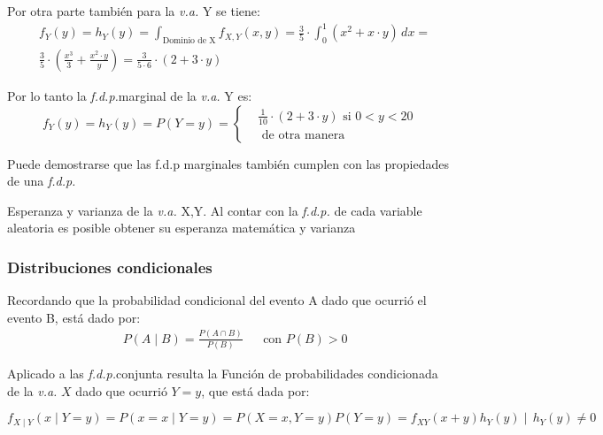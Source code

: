 Por otra parte también para la \textit{v.a.} Y se tiene:
\begin{align*}
    &f_Y\left(y\right)=h_Y\left(y\right) = \int_{\text{Dominio de X}}f_{X,Y} \left(x,y\right) =\frac{3}{5}\cdot \int_0^1\left( x^2+ x\cdot y \right) \,dx=\\
    &\frac{3}{5}\cdot \left(\frac{x^3}{3}+\frac{x^2\cdot  y}{y}\right)=\frac{3}{5\cdot 6}\cdot \left( 2+3\cdot y\right)
\end{align*}

Por lo tanto la \textit{f.d.p.}marginal de la \textit{v.a.} Y es:
\begin{equation*}
    f_Y\left(y\right)=h_Y\left(y\right)=P\left( Y= y\right) =\begin{cases} & \frac{1}{10}\cdot\left( 2+3\cdot y\right)\text{ si }0< y<20 \\
              & \text{ de otra manera }\end{cases}
\end{equation*}


Puede demostrarse que las f.d.p marginales también cumplen con las propiedades de una \textit{f.d.p.}

Esperanza y varianza de la \textit{v.a.} X,Y. Al contar con la \textit{f.d.p.} de cada variable aleatoria es posible obtener su esperanza matemática y varianza

\subsubsection{Distribuciones condicionales}

Recordando que la probabilidad condicional del evento A dado que ocurrió el evento B, está dado por:
\begin{align*}
     & P\left( A\mid B\right) =\frac{P\left( A\cap B\right)}{P\left(B\right)} &  & \text{con }P\left( B\right) >0
\end{align*}

Aplicado a las \textit{f.d.p.}conjunta resulta la Función de probabilidades condicionada de la \textit{v.a.} $X$ dado que ocurrió $Y=y$, que está dada por:

\begin{equation*}
    f_{X \mid Y}\left(x \mid Y =y \right) =P\left(x=x \mid Y= y\right) =P\left( X=x ,Y= y\right) P\left( Y= y\right) =f_{XY}  \left(x+y\right) h_Y\left(y \right)\mid\,h_Y\left(y \right) \neq 0
\end{equation*}

